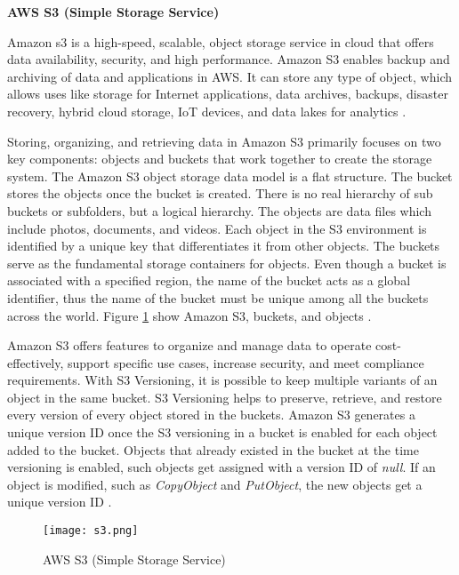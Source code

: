 \textbf{AWS S3 (Simple Storage Service)}

\par Amazon \gls{s3} is a high-speed, scalable, object
storage
service
in cloud that offers data availability, security, and
high performance.
Amazon S3 enables backup and archiving of data and
applications in AWS. It can store any type of object,
which allows uses like storage for Internet applications, data archives, backups, disaster recovery, hybrid cloud storage, IoT devices, and data lakes for analytics \cite{39}.

\par Storing, organizing, and retrieving data in Amazon S3 primarily focuses on two key components: objects and buckets that work together to create the storage system.
The Amazon S3 object storage data model is a flat structure.
The bucket stores the objects once the bucket is created.
There is no real hierarchy of sub buckets or subfolders,
but a logical hierarchy.
The objects are data files which include photos,
documents, and videos.
Each object in the S3 environment
is identified by a unique key that differentiates it from other objects.
The buckets serve as the fundamental storage containers for objects.
Even though a bucket is associated with a specified region, the name of the bucket acts as a global identifier, thus the name of the bucket must be unique among all the buckets across the world.
Figure \ref{fig:s3} show Amazon S3, buckets, and objects
\cite{40}.

\par Amazon S3 offers features to organize and manage data to operate cost-effectively, support specific use cases,
increase security, and meet compliance requirements.
With S3 Versioning, it is possible to keep multiple variants of an object in the same bucket.
S3 Versioning helps to preserve, retrieve, and restore every version of every object stored in the buckets.
Amazon S3 generates a unique version ID once the S3 versioning in a bucket is enabled for each object added to the bucket.
Objects that already existed in the bucket at the time
versioning is enabled, such objects get assigned with a
version ID of \textit{null}. If an object is modified, such as \textit{CopyObject} and \textit{PutObject}, the new objects get a unique version ID \cite{41}.

\begin{figure}
    \centering
    \texttt{[image: s3.png]}
    \caption{AWS S3 (Simple Storage Service)}{\cite{42}}
    \label{fig:s3}
\end{figure}

